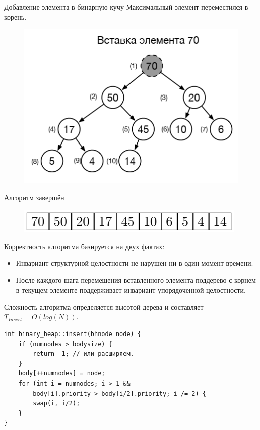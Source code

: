 \documentclass{beamer}
\begin{document}
\begin{frame}{Добавление элемента в бинарную кучу}	
	Максимальный элемент переместился в корень. 
	\begin{figure}[h]
		\centering
		\includegraphics[scale=0.4]{images/lec06-pic13.png}
	\end{figure}
	Алгоритм завершён
	\begin{figure}[h]
		\centering
		\includegraphics[scale=0.4]{images/lec06-pic14.png}
	\end{figure}	
\end{frame}

\begin{frame}[fragile]
	Корректность алгоритма базируется на двух фактах:
	\begin{itemize}
		\item Инвариант структурной целостности не нарушен ни в один момент времени.
		\item После каждого шага перемещения вставленного элемента поддерево с корнем в текущем элементе поддерживает инвариант упорядоченной
целостности.
	\end{itemize}
	Сложность алгоритма определяется высотой дерева и составляет $T_{Insert}=O(log(N))$.
	\begin{verbatim}
int binary_heap::insert(bhnode node) {
	if (numnodes > bodysize) {
		return -1; // или расширяем.
	}
	body[++numnodes] = node;
	for (int i = numnodes; i > 1 && 
		body[i].priority > body[i/2].priority; i /= 2) {
		swap(i, i/2);
	}
}	
	\end{verbatim}
\end{frame}
\end{document}
